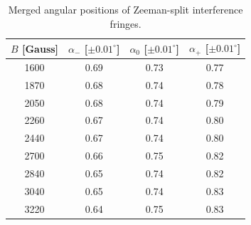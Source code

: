 \begin{table}[H]
\centering
\begin{tabular}{cccc}
\hline
    $B$ [Gauss] & $\alpha_{-}$ [$\pm 0.01^\circ$] & $\alpha_{0}$ [$\pm 0.01^\circ$] & $\alpha_{+}$ [$\pm 0.01^\circ$] \\
\hline
    1600 & 0.69 & 0.73 & 0.77 \\
    1870 & 0.68 & 0.74 & 0.78 \\
    2050 & 0.68 & 0.74 & 0.79 \\
    2260 & 0.67 & 0.74 & 0.80 \\
    2440 & 0.67 & 0.74 & 0.80 \\
    2700 & 0.66 & 0.75 & 0.82 \\
    2840 & 0.65 & 0.74 & 0.82 \\
    3040 & 0.65 & 0.74 & 0.83 \\
    3220 & 0.64 & 0.75 & 0.83 \\
\hline
\end{tabular}
\caption{Merged angular positions of Zeeman-split interference fringes.}
\label{tab:alpha}
\end{table}
